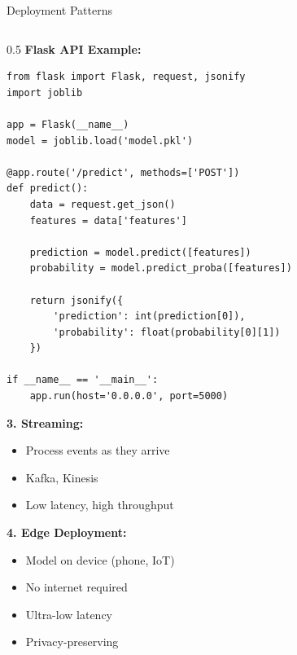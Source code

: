 \begin{frame}{Deployment Patterns}
\begin{columns}
\begin{column}{0.5\textwidth}
\textbf{Flask API Example:}

\begin{verbatim}
from flask import Flask, request, jsonify
import joblib

app = Flask(__name__)
model = joblib.load('model.pkl')

@app.route('/predict', methods=['POST'])
def predict():
    data = request.get_json()
    features = data['features']

    prediction = model.predict([features])
    probability = model.predict_proba([features])

    return jsonify({
        'prediction': int(prediction[0]),
        'probability': float(probability[0][1])
    })

if __name__ == '__main__':
    app.run(host='0.0.0.0', port=5000)
\end{verbatim}

\vspace{0.2cm}

\textbf{3. Streaming:}

\begin{itemize}
\item Process events as they arrive
\item Kafka, Kinesis
\item Low latency, high throughput
\end{itemize}

\vspace{0.2cm}

\textbf{4. Edge Deployment:}

\begin{itemize}
\item Model on device (phone, IoT)
\item No internet required
\item Ultra-low latency
\item Privacy-preserving
\end{itemize}
\end{column}
\end{columns}
\end{frame}

